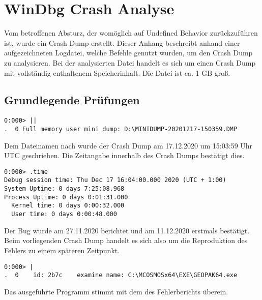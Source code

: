 \lstset{language=WinDbg}

\section{WinDbg Crash Analyse}
\label{sec:windbg}
Vom betroffenen Absturz, der womöglich auf Undefined Behavior zurückzuführen ist, wurde ein Crash Dump erstellt.
Dieser Anhang beschreibt anhand einer aufgezeichneten Logdatei, welche Befehle genutzt wurden, um den Crash Dump zu analysieren.
Bei der analysierten Datei handelt es sich um einen Crash Dump mit vollständig enthaltenem Speicherinhalt. Die Datei ist ca. 1 GB groß.
\subsection{Grundlegende Prüfungen}
\begin{lstlisting}
0:000> ||
.  0 Full memory user mini dump: D:\MINIDUMP-20201217-150359.DMP
\end{lstlisting}
Dem Dateinamen nach wurde der Crash Dump am 17.12.2020 um 15:03:59 Uhr UTC geschrieben. Die Zeitangabe innerhalb des Crash Dumps bestätigt dies.

\begin{lstlisting}
0:000> .time
Debug session time: Thu Dec 17 16:04:00.000 2020 (UTC + 1:00)
System Uptime: 0 days 7:25:08.968
Process Uptime: 0 days 0:01:31.000
  Kernel time: 0 days 0:00:32.000
  User time: 0 days 0:00:48.000
\end{lstlisting}
Der Bug wurde am 27.11.2020 berichtet und am 11.12.2020 erstmals bestätigt. Beim vorliegenden Crash Dump handelt es sich also um die Reproduktion des Fehlers zu einem späteren Zeitpunkt.

\begin{lstlisting}
0:000> |
.  0	id: 2b7c	examine	name: C:\MCOSMOSx64\EXE\GEOPAK64.exe
\end{lstlisting}
Das ausgeführte Programm stimmt mit dem des Fehlerberichts überein.


